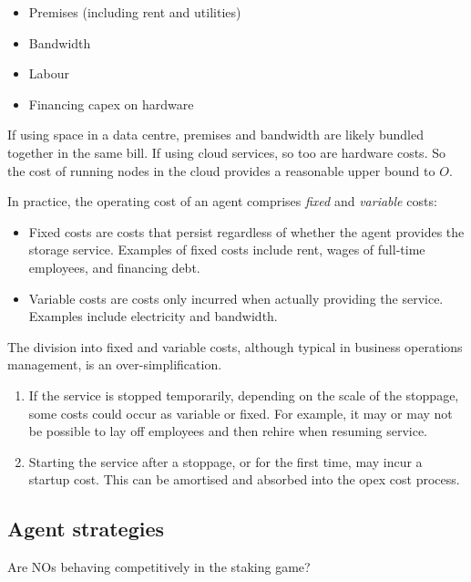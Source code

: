 \begin{itemize}
  \item Premises (including rent and utilities)
  \item Bandwidth
  \item Labour
  \item Financing capex on hardware
\end{itemize}
If using space in a data centre, premises and bandwidth are likely bundled together in the same bill.
%
If using cloud services, so too are hardware costs.
%
So the cost of running nodes in the cloud provides a reasonable upper bound to $O$.

In practice, the operating cost of an agent comprises \emph{fixed} and \emph{variable} costs:
\begin{itemize}
  \item 
    Fixed costs are costs that persist regardless of whether the agent provides the storage service.
    Examples of fixed costs include rent, wages of full-time employees, and financing debt.

  \item
    Variable costs are costs only incurred when actually providing the service.
    Examples include electricity and bandwidth.
\end{itemize}

The division into fixed and variable costs, although typical in business operations management, is an over-simplification.
%
\begin{enumerate}
  \item 
    If the service is stopped temporarily, depending on the scale of the stoppage, some costs could occur as variable or fixed.
    For example, it may or may not be possible to lay off employees and then rehire when resuming service.

  \item
    Starting the service after a stoppage, or for the first time, may incur a startup cost.
    This can be amortised and absorbed into the opex cost process.
\end{enumerate}





\subsection{Agent strategies}

Are NOs behaving competitively in the staking game?
%

